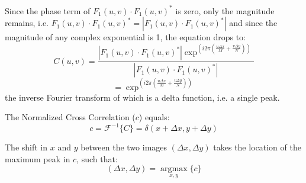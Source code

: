 Since the phase term of $F_{1}(u,v)\cdot F_{1}(u,v)^{*}$ is zero, only the magnitude remains, i.e. $F_{1}(u,v)\cdot F_{1}(u,v)^{*}= \left|F_{1}(u,v)\cdot F_{1}(u,v)^{*}\right|$ and since the magnitude of any complex exponential is 1, the equation drops to:
\[
C(u,v)= \frac{\left|F_{1}(u,v)\cdot F_{1}(u,v)^{*}\right|\exp^{\left(i2\pi\left(\frac{u\Delta x}{M}+\frac{v\Delta y}{N}\right)\right)}}{\left|F_{1}(u,v)\cdot F_{1}(u,v)^{*}\right|}
\]
\begin{equation}
= \exp^{\left(i2\pi\left(\frac{u\Delta x}{M}+\frac{v\Delta y}{N}\right)\right)}
\end{equation}
the inverse Fourier transform of which is a delta function, i.e. a single peak.

The Normalized Cross Correlation ($c$) equals:
\begin{equation}
c= \mathcal{F}^{-1}\{C\}= \delta(x+\Delta x, y+ \Delta y)
\end{equation}

The shift in $x$ and $y$ between the two images $(\Delta x, \Delta y)$ takes the location of the maximum peak in $c$, such that:
\begin{equation}
(\Delta x, \Delta y)= \underset{x,y}{\operatorname{argmax}}\{c\}
\end{equation}

\newpage
